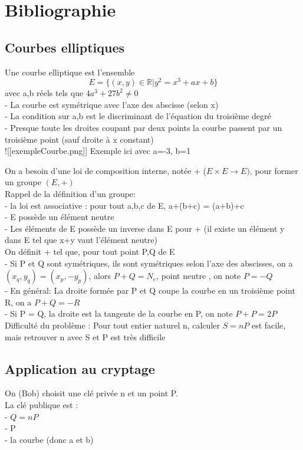 \newpage
\section{Bibliographie}
\subsection{Courbes elliptiques}
Une courbe elliptique est l'ensemble $$ E = \{ (x,y) \in \mathbb{R} | y^2 = x^3 +ax +b\} $$avec a,b réels tels que $4a^3 + 27 b^2 \ne 0$\\
 - La courbe est symétrique avec l'axe des abscisse (selon x)\\
 - La condition sur a,b est le discriminant de l'équation du troisième degré\\
 - Presque toute les droites coupant par deux points la courbe passent par un troisième point (sauf droite à x constant)\\

![[exempleCourbe.png]]
Exemple ici avec a=-3, b=1

On a besoin d'une loi de composition interne, notée + ($E \times E \to E)$, pour former un groupe $(E,+)$\\

Rappel de la définition d'un groupe:\\
 - la loi est associative : pour tout a,b,c de E, a+(b+c) = (a+b)+c\\
 - E possède un élément neutre\\
 - Les éléments de E possède un inverse dans E pour + (il existe un élément y dans E tel que x+y vaut l'élément neutre)\\


On définit + tel que, pour tout point P,Q de E\\
- Si P et Q sont symétriques, ils sont symétriques selon l'axe des abscisses, on a $(x_q,y_q) = (x_p,-y_p)$, alors $P+Q = N_e$,  point neutre , on note $P= -Q$\\
 - En général: La droite formée par P et Q coupe la courbe en un troisième point R, on a $P+Q = - R$\\
 - Si P = Q, la droite est la tangente de la courbe en P, on note $P+P = 2P$\\

Difficulté du problème : Pour tout entier naturel n, calculer $S = nP$ est facile, mais retrouver n avec S et P est très difficile\\

\subsection{Application au cryptage}
On (Bob) choisit une clé privée n et un point P. \\
La clé publique est :\\
 - $Q = nP$\\
 - P\\
 - la courbe (donc a et b)\\


